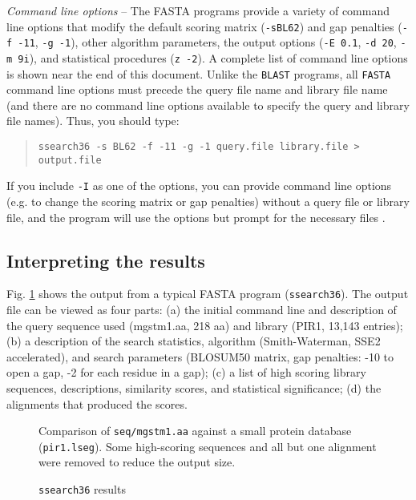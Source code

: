 \documentclass[11pt]{article}
\begin{document}
\emph{Command line options} -- The FASTA programs provide a variety of
command line options that modify the default scoring matrix
(\texttt{-sBL62}) and gap penalties (\texttt{-f -11}, \texttt{-g -1}), other
algorithm parameters, the output options (\texttt{-E 0.1}, \texttt{-d 20},
\texttt{-m 9i}), and statistical procedures (\texttt{z -2}).  A complete
list of command line options is shown near the end of this document.
Unlike the \texttt{BLAST} programs, all \texttt{FASTA} command line options
must precede the query file name and library file name (and there are
no command line options available to specify the query and library
file names).  Thus, you should type:
\begin{quote}
\begin{verbatim}
ssearch36 -s BL62 -f -11 -g -1 query.file library.file > output.file
\end{verbatim}
\end{quote}
If you include \texttt{-I} as one of the options, you can provide
command line options (e.g. to change the scoring matrix or gap
penalties) without a query file or library file, and the program will
use the options but prompt for the necessary files .

\subsection{Interpreting the results}

Fig. \ref{ssearch_run} shows the output from a typical FASTA program
(\texttt{ssearch36}).  The output file can be
viewed as four parts: (a) the initial command line and description of
the query sequence used (mgstm1.aa, 218 aa) and library (PIR1, 13,143
entries); (b) a description of the search statistics, algorithm
(Smith-Waterman, SSE2 accelerated), and search parameters (BLOSUM50
matrix, gap penalties: -10 to open a gap, -2 for each residue in a
gap); (c) a list of high scoring library sequences, descriptions, similarity scores, and statistical significance; (d) the alignments that produced the scores.

\begin{figure}

\caption{\label{ssearch_run}\texttt{ssearch36} results}
\vspace{1.0ex}
Comparison of \texttt{seq/mgstm1.aa} against a small protein database
(\texttt{pir1.lseg}). Some high-scoring sequences and all but one
alignment were removed to reduce the output size.
\end{figure}
\end{document}
